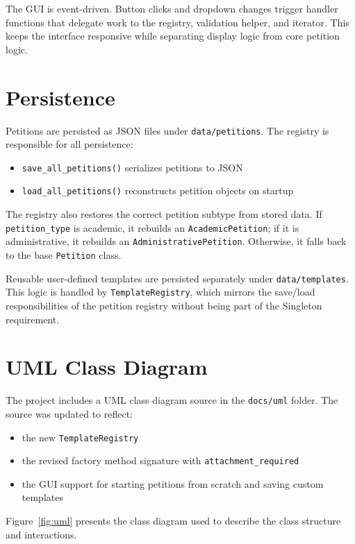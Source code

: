\documentclass[11pt,a4paper]{article}
\begin{document}
The GUI is event-driven. Button clicks and dropdown changes trigger handler
functions that delegate work to the registry, validation helper, and iterator.
This keeps the interface responsive while separating display logic from core
petition logic.

\section{Persistence}

Petitions are persisted as JSON files under \texttt{data/petitions}. The
registry is responsible for all persistence:
\begin{itemize}[leftmargin=1.5em]
    \item \texttt{save\_all\_petitions()} serializes petitions to JSON
    \item \texttt{load\_all\_petitions()} reconstructs petition objects on startup
\end{itemize}

The registry also restores the correct petition subtype from stored data. If
\texttt{petition\_type} is academic, it rebuilds an \texttt{AcademicPetition};
if it is administrative, it rebuilds an
\texttt{AdministrativePetition}. Otherwise, it falls back to the base
\texttt{Petition} class.

Reusable user-defined templates are persisted separately under
\texttt{data/templates}. This logic is handled by \texttt{TemplateRegistry},
which mirrors the save/load responsibilities of the petition registry without
being part of the Singleton requirement.

\section{UML Class Diagram}

The project includes a UML class diagram source in the \texttt{docs/uml} folder.
The source was updated to reflect:
\begin{itemize}[leftmargin=1.5em]
    \item the new \texttt{TemplateRegistry}
    \item the revised factory method signature with
    \texttt{attachment\_required}
    \item the GUI support for starting petitions from scratch and saving custom
    templates
\end{itemize}

Figure~\ref{fig:uml} presents the class diagram used to describe the class
structure and interactions.
\end{document}
